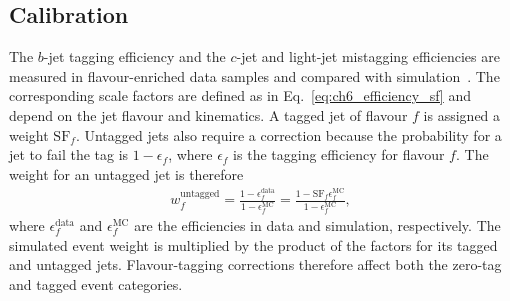 \subsection{Calibration}

The $b$-jet tagging efficiency and the $c$-jet and light-jet mistagging efficiencies are measured in flavour-enriched data samples and compared with simulation~\cite{ATLAS2026GN2}.
The corresponding scale factors are defined as in Eq.~\ref{eq:ch6_efficiency_sf} and depend on the jet flavour and kinematics.
A tagged jet of flavour $f$ is assigned a weight $\mathrm{SF}_f$.
Untagged jets also require a correction because the probability for a jet to fail the tag is $1-\epsilon_f$, where $\epsilon_f$ is the tagging efficiency for flavour $f$.
The weight for an untagged jet is therefore
\begin{align}
    w_f^{\mathrm{untagged}}
    =\frac{1-\epsilon_f^{\mathrm{data}}}{1-\epsilon_f^{\mathrm{MC}}}
    =\frac{1-\mathrm{SF}_f\epsilon_f^{\mathrm{MC}}}{1-\epsilon_f^{\mathrm{MC}}},
    \label{eq:ch6_btag_untagged}
\end{align}
where $\epsilon_f^{\mathrm{data}}$ and $\epsilon_f^{\mathrm{MC}}$ are the efficiencies in data and simulation, respectively.
The simulated event weight is multiplied by the product of the factors for its tagged and untagged jets.
Flavour-tagging corrections therefore affect both the zero-tag and tagged event categories.
